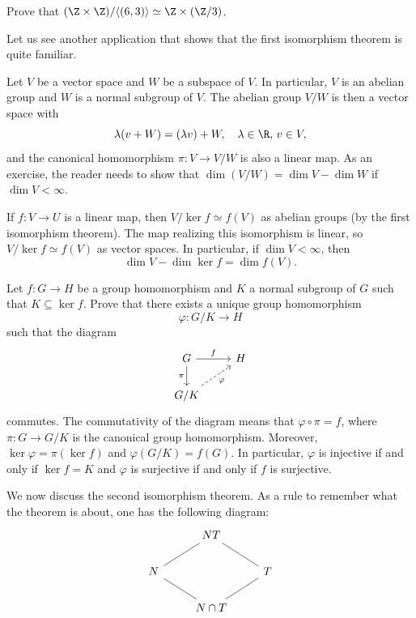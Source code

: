 
\begin{exercise}
Prove that 
$(\Z\times\Z)/\langle (6,3)\rangle\simeq\Z\times(\Z/3)$.
\end{exercise}

Let us see another application that shows that
the first isomorphism theorem is quite familiar. 

\begin{example}
Let $V$ be a vector space and $W$ be a subspace of $V$. 
In particular, 
$V$ is an abelian group and 
$W$ is a normal subgroup of $V$. The abelian group 
$V/W$ is then a vector space with 
\[
\lambda(v+W)=(\lambda v)+W,\quad \lambda\in\R,\,v\in V,
\]
and the canonical homomorphism
$\pi\colon V\to V/W$ is also a linear map. As an exercise, 
the reader needs to show that 
$\dim (V/W)=\dim V-\dim W$
if $\dim V<\infty$.

If $f\colon V\to U$ is a linear map, then
$V/\ker f\simeq f(V)$ as abelian groups (by the first
isomorphism theorem). The map realizing this
isomorphism is linear, so 
$V/\ker f\simeq f(V)$ as vector spaces. In particular, 
if $\dim V<\infty$, then
\[
\dim V-\dim\ker f=\dim f(V).
\]
\end{example}

\begin{exercise}
\label{xca:quotients}
Let $f\colon G\to H$ be a group homomorphism and 
$K$ a normal subgroup of $G$ such that $K\subseteq\ker f$. 
Prove that there exists a unique group homomorphism 
\[
\varphi\colon G/K\to H
\]
such that the diagram 
\[\begin{tikzcd}
        G & H \\
        {G/K}
        \arrow["f", from=1-1, to=1-2]
        \arrow["\pi"', from=1-1, to=2-1]
        \arrow["\varphi"', dashed, from=2-1, to=1-2]
\end{tikzcd}
\]
commutes. The commutativity of the diagram means that  $\varphi\circ\pi=f$, where $\pi\colon G\to G/K$ is the canonical group
homomorphism. Moreover, 
$\ker\varphi=\pi(\ker f)$ and $\varphi(G/K)=f(G)$.
In particular, $\varphi$ is injective if and only if 
$\ker f=K$ and $\varphi$ is surjective if and only if $f$ is surjective. 
\end{exercise}

We now discuss the second isomorphism theorem. As a rule to remember
what the theorem is about, one has the following diagram:
\[\begin{tikzcd}
        & NT \\
        N && T \\
        & {N\cap T}
        \arrow[no head, from=1-2, to=2-3]
        \arrow[no head, from=1-2, to=2-1]
        \arrow[no head, from=2-1, to=3-2]
        \arrow[no head, from=2-3, to=3-2]
\end{tikzcd}\]


